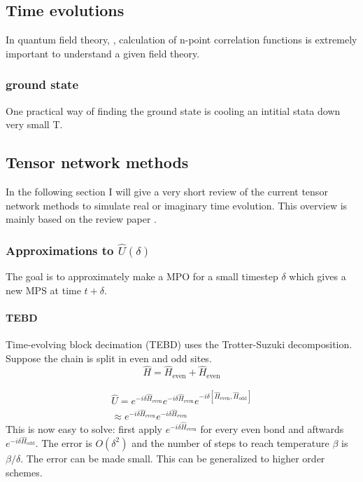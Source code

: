 \subsection{Time evolutions}
In quantum field theory, , calculation of n-point correlation functions is extremely important to understand a given field theory.

\subsubsection{ground state}
One practical way of finding the ground state is cooling an intitial stata down very small T.

\subsection{Tensor network methods}
In the following section I will give a very short review of the current tensor network methods to simulate real or imaginary time evolution. This overview is mainly based on the review paper \cite{Paeckel2019}.


\subsubsection{Approximations to  \texorpdfstring{$ \hat{U}(\delta)$}{U}   }
The goal is to approximately make a MPO for a small timestep $\delta$ which gives a new MPS at time $t+\delta$.
\paragraph{TEBD}
Time-evolving block decimation (TEBD)  uses the Trotter-Suzuki decomposition. Suppose the chain is split in even and odd sites.
\begin{equation}
  \hat{H} = \hat{H}_{\text{even}}+\hat{H}_{\text{even}}
\end{equation}

\begin{equation}
  \begin{split}
    \hat{U} = e^{-i \delta \hat{H}_{\text{even}}}  e^{-i \delta \hat{H}_{\text{even}} }e^{-i \delta \left[ \hat{H}_{\text{even}}, \hat{H}_{\text{odd}} \right] }\\
    \approx e^{-i \delta \hat{H}_{\text{even}}}  e^{-i \delta \hat{H}_{\text{even}} }
  \end{split}
\end{equation}
This is now easy to solve: first apply $e^{-i \delta \hat{H}_{\text{even}}}$ for every even bond and aftwards  $e^{-i \delta \hat{H}_{\text{odd}}}$. The error is $O(\delta^2)$ and the number of steps to reach temperature $\beta$ is $\beta / \delta$. The error can be made small. This can be generalized to higher order schemes.

